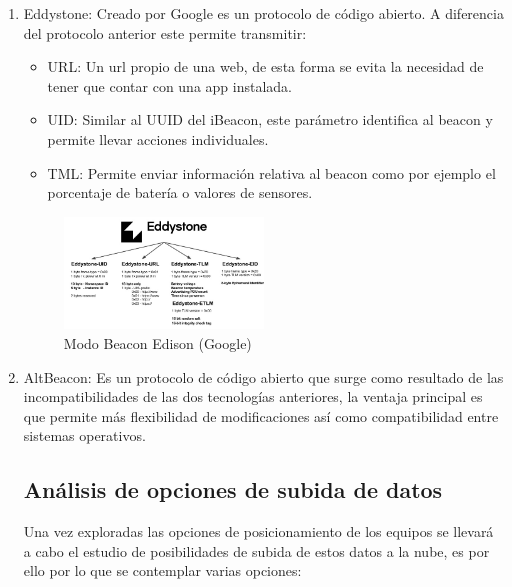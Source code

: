 \documentclass[a4paper ,12pt, onecolumn]{article}
\begin{document}
\begin{enumerate}
\begin{center}
\begin{figure}[ht]
                        \label{fig:mesh2}
                    \end{figure}
                \end{center}
                \item Eddystone: Creado por Google es un protocolo de código abierto. A diferencia del protocolo anterior este 
                permite transmitir:
                \begin{itemize}
                    \item URL: Un url propio de una web, de esta forma se evita la necesidad de tener que contar con una app instalada.
                    \item UID: Similar al UUID del iBeacon, este parámetro identifica al beacon y permite llevar acciones individuales.
                    \item TML: Permite enviar información relativa al beacon como por ejemplo el porcentaje de batería o valores de sensores.
                \end{itemize}
                \begin{center}
                    \begin{figure}[ht]
                        \centering
                        \includegraphics[width=0.5\textwidth]{tipos_beacon_edison.PNG}
                        \caption{Modo Beacon Edison (Google) }
                        \label{fig:mesh3}
                    \end{figure}
                \end{center}
                \item AltBeacon: Es un protocolo de código abierto que surge como resultado de las incompatibilidades de las dos 
                tecnologías anteriores, la ventaja principal es que permite más flexibilidad de modificaciones así como compatibilidad 
                entre sistemas operativos.
    \subsection{Análisis de opciones de subida de datos}
        Una vez exploradas las opciones de posicionamiento de los equipos se llevará a cabo el estudio de posibilidades de subida de estos datos
        a la nube, es por ello por lo que se contemplar varias opciones:

\end{enumerate}
\end{document}
